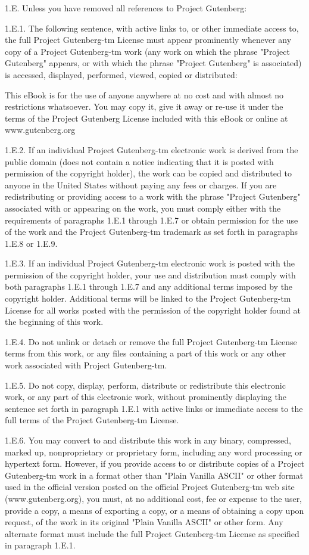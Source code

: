 \begin{PGtext}
1.E.  Unless you have removed all references to Project Gutenberg:

1.E.1.  The following sentence, with active links to, or other immediate
access to, the full Project Gutenberg-tm License must appear prominently
whenever any copy of a Project Gutenberg-tm work (any work on which the
phrase "Project Gutenberg" appears, or with which the phrase "Project
Gutenberg" is associated) is accessed, displayed, performed, viewed,
copied or distributed:

This eBook is for the use of anyone anywhere at no cost and with
almost no restrictions whatsoever.  You may copy it, give it away or
re-use it under the terms of the Project Gutenberg License included
with this eBook or online at www.gutenberg.org

1.E.2.  If an individual Project Gutenberg-tm electronic work is derived
from the public domain (does not contain a notice indicating that it is
posted with permission of the copyright holder), the work can be copied
and distributed to anyone in the United States without paying any fees
or charges.  If you are redistributing or providing access to a work
with the phrase "Project Gutenberg" associated with or appearing on the
work, you must comply either with the requirements of paragraphs 1.E.1
through 1.E.7 or obtain permission for the use of the work and the
Project Gutenberg-tm trademark as set forth in paragraphs 1.E.8 or
1.E.9.

1.E.3.  If an individual Project Gutenberg-tm electronic work is posted
with the permission of the copyright holder, your use and distribution
must comply with both paragraphs 1.E.1 through 1.E.7 and any additional
terms imposed by the copyright holder.  Additional terms will be linked
to the Project Gutenberg-tm License for all works posted with the
permission of the copyright holder found at the beginning of this work.

1.E.4.  Do not unlink or detach or remove the full Project Gutenberg-tm
License terms from this work, or any files containing a part of this
work or any other work associated with Project Gutenberg-tm.

1.E.5.  Do not copy, display, perform, distribute or redistribute this
electronic work, or any part of this electronic work, without
prominently displaying the sentence set forth in paragraph 1.E.1 with
active links or immediate access to the full terms of the Project
Gutenberg-tm License.

1.E.6.  You may convert to and distribute this work in any binary,
compressed, marked up, nonproprietary or proprietary form, including any
word processing or hypertext form.  However, if you provide access to or
distribute copies of a Project Gutenberg-tm work in a format other than
"Plain Vanilla ASCII" or other format used in the official version
posted on the official Project Gutenberg-tm web site (www.gutenberg.org),
you must, at no additional cost, fee or expense to the user, provide a
copy, a means of exporting a copy, or a means of obtaining a copy upon
request, of the work in its original "Plain Vanilla ASCII" or other
form.  Any alternate format must include the full Project Gutenberg-tm
License as specified in paragraph 1.E.1.


\end{PGtext}
